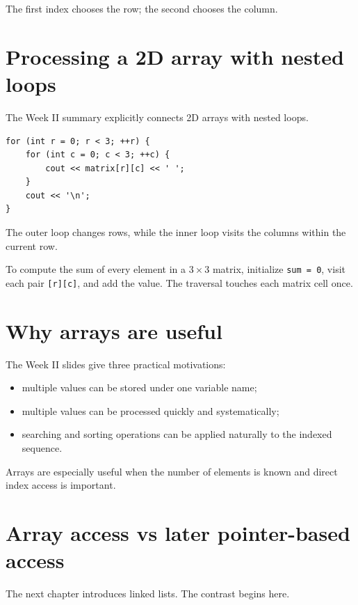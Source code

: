 The first index chooses the row; the second chooses the column.

\section{Processing a 2D array with nested loops}

The Week II summary explicitly connects 2D arrays with nested loops.

\begin{lstlisting}
for (int r = 0; r < 3; ++r) {
    for (int c = 0; c < 3; ++c) {
        cout << matrix[r][c] << ' ';
    }
    cout << '\n';
}
\end{lstlisting}

The outer loop changes rows, while the inner loop visits the columns within the current row.

\begin{workedexample}
To compute the sum of every element in a $3\times3$ matrix, initialize \texttt{sum = 0}, visit each pair \texttt{[r][c]}, and add the value. The traversal touches each matrix cell once.
\end{workedexample}

\section{Why arrays are useful}

The Week II slides give three practical motivations:

\begin{itemize}
  \item multiple values can be stored under one variable name;
  \item multiple values can be processed quickly and systematically;
  \item searching and sorting operations can be applied naturally to the indexed sequence.
\end{itemize}

Arrays are especially useful when the number of elements is known and direct index access is important.

\section{Array access vs later pointer-based access}

The next chapter introduces linked lists. The contrast begins here.

